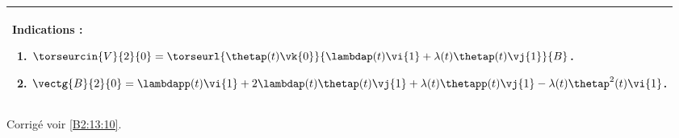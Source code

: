 \ifprof
\else
\footnotesize
\ifcolle
\else
\begin{center}
\begin{tabular}{|p{.9\linewidth}|}
\hline
Indications :
\begin{enumerate}
\item $\torseurcin{V}{2}{0} = \torseurl{\thetap(t)\vk{0}}{\lambdap(t) \vi{1}+\lambda(t)\thetap(t)\vj{1}}{B}$.
\item $\vectg{B}{2}{0} = \lambdapp(t) \vi{1}+2 \lambdap(t) \thetap(t) \vj{1}+\lambda(t)\thetapp(t)\vj{1}-\lambda(t)\thetap^2(t)\vi{1} $.
\end{enumerate} \\ \hline
\end{tabular}
\end{center}
\fi

\normalsize
\begin{flushright}
\footnotesize{Corrigé  voir \ref{B2:13:10}.}
\end{flushright}%
\fi